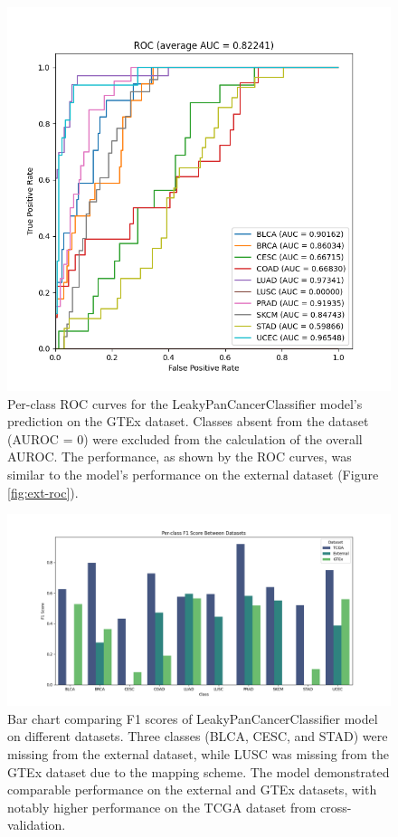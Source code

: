 \documentclass{l4proj}
\begin{document}
\begin{appendices}
\begin{figure}
    \centering
    \includegraphics[width=0.75\linewidth]{images/gtex_roc.png}
    \caption{Per-class ROC curves for the LeakyPanCancerClassifier model's prediction on the GTEx dataset. Classes absent from the dataset (AUROC = 0) were excluded from the calculation of the overall AUROC. The performance, as shown by the ROC curves, was similar to the model's performance on the external dataset (Figure \ref{fig:ext-roc}).}
    \label{fig:gtex-roc}
\end{figure}

\begin{figure}
    \centering
    \includegraphics[width=1\linewidth]{images/f1_datasets.png}
    \caption{Bar chart comparing F1 scores of LeakyPanCancerClassifier model on different datasets. Three classes (BLCA, CESC, and STAD) were missing from the external dataset, while LUSC was missing from the GTEx dataset due to the mapping scheme. The model demonstrated comparable performance on the external and GTEx datasets, with notably higher performance on the TCGA dataset from cross-validation.}
    \label{fig:f1-datasets}
\end{figure}


\end{appendices}
\end{document}

